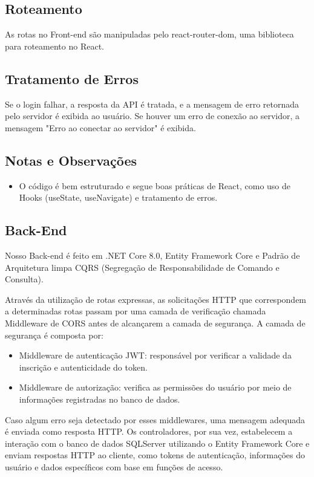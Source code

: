 \documentclass[a4paper,12pt]{report}
\begin{document}
\subsection{Roteamento} 
As rotas no Front-end são manipuladas pelo react-router-dom, uma biblioteca para roteamento no React. 

\subsection{Tratamento de Erros} 
Se o login falhar, a resposta da API é tratada, e a mensagem de erro retornada pelo servidor é exibida ao usuário. Se houver um erro de conexão ao servidor, a mensagem "Erro ao conectar ao servidor" é exibida. 

\subsection{Notas e Observações} 
\begin{itemize} 
    \item O código é bem estruturado e segue boas práticas de React, como uso de Hooks (useState, useNavigate) e tratamento de erros. 
\end{itemize} 

\subsection{Back-End} 
Nosso Back-end é feito em .NET Core 8.0, Entity Framework Core e Padrão de Arquitetura limpa CQRS (Segregação de Responsabilidade de Comando e Consulta).
  
Através da utilização de rotas expressas, as solicitações HTTP que correspondem a determinadas rotas passam por uma camada de verificação chamada Middleware de CORS antes de alcançarem a camada de segurança. 
A camada de segurança é composta por: 
\begin{itemize} 
  \item Middleware de autenticação JWT: responsável por verificar a validade da inscrição e autenticidade do token. 
  \item Middleware de autorização: verifica as permissões do usuário por meio de informações registradas no banco de dados. 
\end{itemize} 
Caso algum erro seja detectado por esses middlewares, uma mensagem adequada é enviada como resposta HTTP. 
Os controladores, por sua vez, estabelecem a interação com o banco de dados SQLServer utilizando o Entity Framework Core e enviam respostas HTTP ao cliente, como tokens de autenticação, informações do usuário e dados específicos com base em funções de acesso. 
\end{document}
